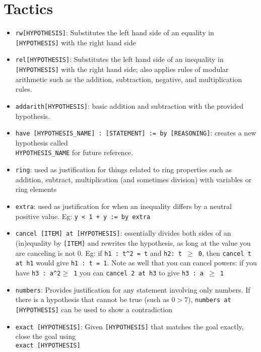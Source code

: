 \documentclass{exam}
\begin{document}
    \pagestyle{headandfoot}
    \runningheadrule
    \firstpageheadrule
    \runningfooter{}{\thepage}{}
    \firstpagefooter{}{}{}

    \section*{Tactics}
    \begin{itemize}
        \item \verb|rw[HYPOTHESIS]|: Substitutes the left hand side of an equality in \texttt{[HYPOTHESIS]} with the right hand side
        \item \verb|rel[HYPOTHESIS]|: Substitutes the left hand side of an inequality in \texttt{[HYPOTHESIS]} with the right hand side; also applies rules of modular arithmetic such as the addition, subtraction, negative, and multiplication rules. 
        \item \verb|addarith[HYPOTHESIS]|: basic addition and subtraction with the provided hypothesis. 
        \item \verb|have [HYPOTHESIS_NAME] : [STATEMENT] := by [REASONING]|: creates a new hypothesis called \\ \verb|HYPOTHESIS_NAME| for future reference. 
        \item \verb|ring|: used as justification for things related to ring properties such as addition, subtract, multiplication (and sometimes division) with variables or ring elements
        \item \verb|extra|: used as justification for when an inequality differs by a neutral positive value. Eg: \texttt{y < 1 + y := by extra}
        \item \verb|cancel [ITEM] at [HYPOTHESIS]|: essentially divides both sides of an (in)equality by \verb|[ITEM]| and rewrites the hypothesis, as long at the value you are canceling is not 0. Eg: if \texttt{h1 : t\^{}2 = t} and \texttt{h2: t $\geq$ 0}, then \texttt{cancel t at h1} would give \texttt{h1 : t = 1}. Note as well that you can cancel powers: if you have \texttt{h3 : a\^{}2$\geq$ 1} you can \texttt{cancel 2 at h3} to give \texttt{h3 : a $\geq$ 1}
        \item \verb|numbers|: Provides justification for any statement involving only numbers. If there is a hypothesis that cannot be true (such as $0 > 7$), \texttt{numbers at [HYPOTHESIS]} can be used to show a contradiction
        \item \verb|exact [HYPOTHESIS]|: Given \texttt{[HYPOTHESIS]} that matches the goal exactly, close the goal using \\ \verb|exact [HYPOTHESIS]|

\end{itemize}
\end{document}
